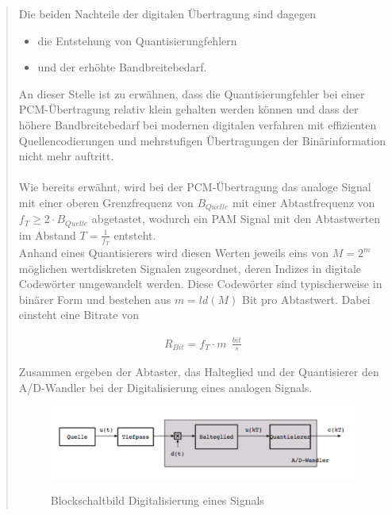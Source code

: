 \begin{quote}
	\vspace{1em}
	
	Die beiden Nachteile der digitalen Übertragung sind dagegen
	\begin{itemize}
		\item die Entstehung von Quantisierungfehlern
		\item und der erhöhte Bandbreitebedarf.
	\end{itemize}
	
	\vspace{0.5em}
	
	An dieser Stelle ist zu erwähnen, dass die Quantisierungfehler bei einer
	PCM-Übertragung relativ klein gehalten werden können und dass der höhere
	Bandbreitebedarf bei modernen digitalen verfahren mit effizienten
	Quellencodierungen und mehrstufigen Übertragungen der Binärinformation nicht
	mehr auftritt.\\
	
	 \\
	Wie bereits erwähnt, wird bei der PCM-Übertragung das analoge Signal mit einer
	oberen Grenzfrequenz von $B_{Quelle}$ mit einer Abtastfrequenz von $f_T \geq 2
	\cdot B_{Quelle}$ abgetastet, wodurch ein PAM Signal mit den Abtastwerten im
	Abstand $T = \frac{1}{f_T}$ entsteht.\\
	Anhand eines Quantisierers wird diesen Werten jeweils eins von $M = 2^m$ möglichen wertdiskreten Signalen zugeordnet,
	deren Indizes in digitale Codewörter umgewandelt werden. Diese Codewörter sind
	typischerweise in binärer Form und bestehen aus $m = ld(M)$ Bit pro Abtastwert.
	Dabei einsteht eine Bitrate von
	
       \begin{equation*}
        	\begin{split}
        		R_{Bit} = f_T \cdot m \ \ \frac{bit}{s}
        	\end{split}
        \end{equation*}        
    
	\vspace{0.5em}
	   
	Zusammen ergeben der Abtaster, das Halteglied und der Quantisierer den
	A/D-Wandler bei der Digitalisierung eines analogen Signals.\\
	
	\begin{figure}[H]
    \centering
        \includegraphics[scale=0.7, trim = 0cm 0cm 0cm 0cm, clip]{./Bilder/Digitalisierung_des_Signals}
            \caption{Blockschaltbild Digitalisierung eines Signals}
            \cite{Digitalisierung_des_Signals}
    \end{figure}
    

\end{quote}
